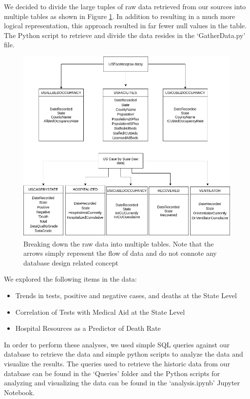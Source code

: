 \documentclass[11pt]{article}
\begin{document}
\noindent
We decided to divide the large tuples of raw data retrieved from our sources into multiple tables as shown in Figure \ref{fig:tbl_bd}. In addition to resulting in a much more logical representation, this approach resulted in far fewer null values in the table. The Python script to retrieve and divide the data resides in the `GatherData.py' file.

\FloatBarrier
\begin{figure}[h]
    \centering
    \includegraphics[width=\textwidth]{diagrams/data_breakdown.png}
    \caption{Breaking down the raw data into multiple tables. Note that the arrows simply represent the flow of data and do not connote any database design related concept}
    \label{fig:tbl_bd}
\end{figure}
\FloatBarrier

\noindent
We explored the following items in the data:
\begin{itemize}
    \item Trends in tests, positive and negative cases, and deaths at the State Level
    \item Correlation of Tests with Medical Aid at the State Level
    \item Hospital Resources as a Predictor of Death Rate
\end{itemize}
In order to perform these analyses, we used simple SQL queries against our database to retrieve the data and simple python scripts to analyze the data and visualize the results. The queries used to retrieve the historic data from our database can be found in the `Queries' folder and the Python scripts for analyzing and visualizing the data can be found in the `analysis.ipynb' Jupyter Notebook.
\end{document}

